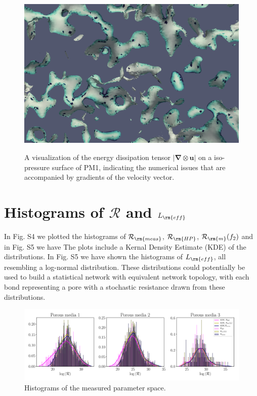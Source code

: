 \documentclass[draft,jgrga]{agutexSI2019}
\begin{document}
\begin{figure}
\noindent\includegraphics[height=8cm]{figures/nummeric_noise.png}
\caption{A visualization of the energy dissipation tensor $|\mathbf{\nabla}\otimes \mathbf{u}|$ on a iso-pressure surface of PM1, indicating the numerical issues that are accompanied by gradients of the velocity vector.}
\label{fig:numerical noise}
\end{figure}



\section{Histograms of $\mathcal{R}$ and $L_{\rm{eff}}$}

In Fig. S4 we plotted the histograms of  $\mathcal{R}_{\rm{meas}}$, $\mathcal{R}_{\rm{HP}}$, $\mathcal{R}_{\rm{m}}(f_2)$ and in Fig. S5 we have
The plots include a Kernal Density Estimate (KDE) of the distributions. In Fig. S5 we have shown the histograms of $L_{\rm{eff}}$, all resembling a log-normal distribution. These distributions could potentially be used to build a statistical network with equivalent network topology, with each bond representing a pore with a stochastic resistance drawn from these distributions. 



\begin{figure}
\noindent\includegraphics[width=15cm]{figures/hydraulic_resistance_integrated_histogram.pdf}
\caption{Histograms of the measured parameter space. }\label{Fig:Hist}
\end{figure}
\end{document}
